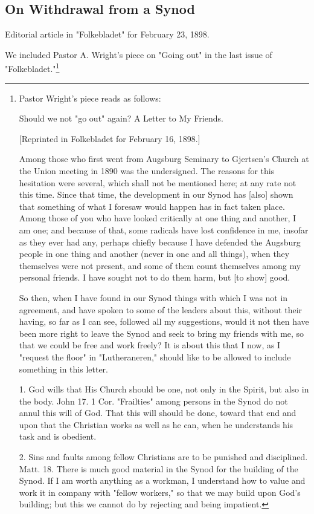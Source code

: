 
\subsection{On Withdrawal from a Synod}

Editorial article in "Folkebladet" for February 23, 1898.

We included Pastor A. Wright’s piece on "Going out" in the last issue of "Folkebladet."\footnote{
Pastor Wright’s piece reads as follows:

Should we not "go out" again?
A Letter to My Friends.

[Reprinted in Folkebladet for February 16, 1898.]

Among those who first went from Augsburg Seminary to Gjertsen’s Church at the Union meeting in 1890 was the undersigned. The reasons for this hesitation were several, which shall not be mentioned here; at any rate not this time. Since that time, the development in our Synod has [also] shown that something of what I foresaw would happen has in fact taken place. Among those of you who have looked critically at one thing and another, I am one; and because of that, some radicals have lost confidence in me, insofar as they ever had any, perhaps chiefly because I have defended the Augsburg people in one thing and another (never in one and all things), when they themselves were not present, and some of them count themselves among my personal friends. I have sought not to do them harm, but [to show] good.

So then, when I have found in our Synod things with which I was not in agreement, and have spoken to some of the leaders about this, without their having, so far as I can see, followed all my suggestions, would it not then have been more right to leave the Synod and seek to bring my friends with me, so that we could be free and work freely? It is about this that I now, as I "request the floor" in "Lutheraneren," should like to be allowed to include something in this letter.

1. God wills that His Church should be one, not only in the Spirit, but also in the body. John 17. 1 Cor. "Frailties" among persons in the Synod do not annul this will of God. That this will should be done, toward that end and upon that the Christian works as well as he can, when he understands his task and is obedient.

2. Sins and faults among fellow Christians are to be punished and disciplined. Matt. 18. There is much good material in the Synod for the building of the Synod. If I am worth anything as a workman, I understand how to value and work it in company with "fellow workers," so that we may build upon God’s building; but this we cannot do by rejecting and being impatient.

}
